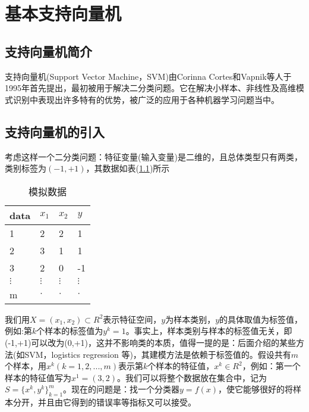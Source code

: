 
\chapter{基本支持向量机}
\section{支持向量机简介}
	支持向量机(Support Vector Machine，SVM)由Corinna Cortes和Vapnik等人于1995年首先提出，最初被用于解决二分类问题。它在解决小样本、非线性及高维模式识别中表现出许多特有的优势，被广泛的应用于各种机器学习问题当中。

\section{支持向量机的引入}
	考虑这样一个二分类问题：特征变量(输入变量)是二维的，且总体类型只有两类，类别标签为$(-1,+1)$，其数据如表(\ref{tab:SVM模拟数据})所示
	\begin{table}[htbp]
		\caption{模拟数据}
		\label{tab:SVM模拟数据}
		\centering
		\begin{tabular}{l|lll}
		\toprule
		data   & $x_1$    & $x_2$    & $y$ \\
		\midrule
		1      & 2      & 2      & 1 \\
		2      & 3      & 1      & 1 \\
		3      & 2      & 0      & -1 \\
		$\vdots$ & $\vdots$ & $\vdots$ & $\vdots$ \\
		m      & $\cdot$  & $\cdot$  & $\cdot$ \\
		\bottomrule
		\end{tabular}
	\end{table}
	\par
	我们用$X=(x_1,x_2)\subset R^2$表示特征空间，$y$为样本类别，$y$的具体取值为标签值，例如:第$k$个样本的标签值为$y^k=1$。事实上，样本类别与样本的标签值无关，即(-1,+1)可以改为(0,+1)，这并不影响类的本质，值得一提的是：后面介绍的某些方法(如SVM，logistics regression 等)，其建模方法是依赖于标签值的。假设共有$m$个样本，用$x^k(k=1,2,...,m)$表示第$k$个样本的特征值，$x^k\in R^2$，例如：第一个样本的特征值写为$x^1=(3,2)$。我们可以将整个数据放在集合中，记为$S=\{x^k,y^k\}_{k=1}^m$。现在的问题是：找一个分类器$y=f(x)$，使它能够很好的将样本分开，并且由它得到的错误率等指标又可以接受。
	\par
